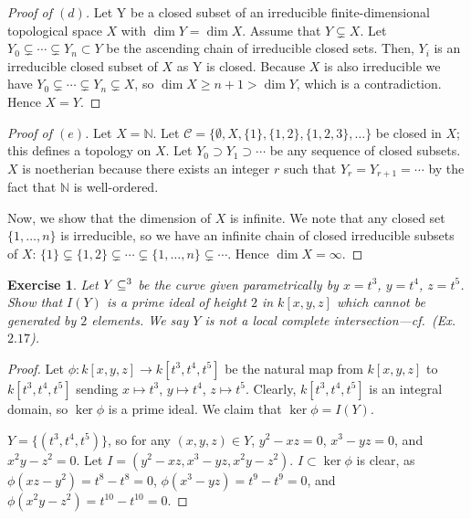 \documentclass[12pt,letterpaper]{article}
\newtheorem{problem}{Exercise}[section]
\theoremstyle{definition}
\theoremstyle{remark}
\numberwithin{equation}{section}
\numberwithin{figure}{problem}
\let\AA\relax
\DeclareMathOperator{\AA}{\mathbb{A}}
\begin{document}
\begin{proof}[Proof of $(d)$]
	Let Y be a closed subset of an irreducible finite-dimensional topological space $X$ with $\dim Y = \dim X$. 
	Assume that $Y \subsetneq X$. Let $Y_0 \subsetneq \cdots \subsetneq Y_n
  \subset Y$ be the ascending chain of irreducible closed sets. Then, $Y_i$ is
  an irreducible closed subset of $X$ as Y is closed. Because $X$ is also irreducible we have $Y_0 \subsetneq \cdots \subsetneq Y_n \subsetneq X$, so $\dim X \geq n+1 > \dim Y$, which is a contradiction. Hence $X = Y$. 
\end{proof}
\begin{proof}[Proof of $(e)$]
  Let $X = \mathbb{N}$. Let $\mathscr{C} = \{ \emptyset, X, \{1\},
  \{1,2\}, \{1,2,3\},\ldots\}$ be closed in $X$; this defines a topology on $X$.
	Let $Y_0 \supset Y_1 \supset \cdots$ be any sequence of closed subsets.
  $X$ is noetherian because there exists an integer $r$ such that $Y_r = Y_{r+1}
  = \cdots$ by the fact that $\mathbb{N}$ is well-ordered. 
	\par Now, we show that the dimension of $X$ is infinite.
  We note that any closed set $\{1, \ldots,n\}$ is irreducible, so we have an
  infinite chain of closed irreducible subsets of $X$: $\{1\} \subsetneq \{1,2\}
  \subsetneq \cdots \subsetneq \{1,\ldots,n\} \subsetneq \cdots$. Hence $\dim X
  = \infty$.
\end{proof}

\begin{problem}
  Let $Y \subseteq \AA^3$ be the curve given parametrically by
  $x = t^3$, $y= t^4$, $z = t^5$.
  Show that $I(Y)$ is a prime ideal of height $2$ in $k[x,y,z]$ which cannot
  be generated by $2$ elements.
  We say $Y$ is \emph{not a local complete
  intersection}---cf.~\emph{(Ex.~$2.17$)}. 
\end{problem}
\begin{proof}

Let $\phi: k[x,y,z] \to k[t^3, t^4, t^5]$ be the natural map from $k[x,y,z]$ to $k[t^3, t^4, t^5]$ sending $x \mapsto t^3$, $y \mapsto t^4$, $z \mapsto t^5$. Clearly, $k[t^3,t^4,t^5]$ is an integral domain, so $\ker \phi$ is a prime ideal. We claim that $\ker \phi = I(Y)$.

$Y = \{(t^3, t^4, t^5)\}$, so for any $(x,y,z) \in Y$, $y^2-xz =0$, $x^3-yz =0$, and $x^2y-z^2 = 0$. Let $I = (y^2-xz, x^3-yz, x^2y-z^2)$. $I \subset \ker \phi$ is clear, as $\phi(xz-y^2) = t^8-t^8 = 0$, $\phi(x^3-yz) = t^9 -t^9 = 0$, and $\phi(x^2y - z^2) = t^{10}-t^{10} = 0$. 

\end{proof}
\end{document}
